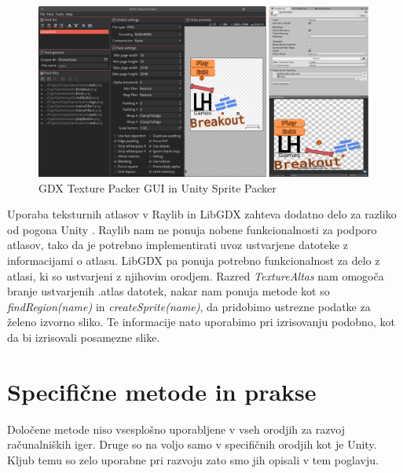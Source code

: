 \documentclass[12pt,a4paper,twoside]{book}
\begin{document}
\begin{figure}[h]
	\centering
	\includegraphics[width=15cm]{texturePacker}
	\caption{GDX Texture Packer GUI in Unity Sprite Packer}
	\label{slika:texturePacker}
\end{figure}
Uporaba teksturnih atlasov v Raylib in LibGDX zahteva dodatno delo za razliko od pogona Unity . Raylib nam ne ponuja nobene funkcionalnosti za podporo atlasov, tako da je potrebno implementirati uvoz ustvarjene datoteke z informacijami o atlasu. LibGDX pa ponuja potrebno funkcionalnost za delo z atlasi, ki so ustvarjeni z njihovim orodjem. Razred \textit{TextureAltas} nam omogoča branje ustvarjenih .atlas datotek, nakar nam ponuja metode kot so \textit{findRegion(name)} in \textit{createSprite(name)}, da pridobimo ustrezne podatke za želeno izvorno sliko. Te informacije nato uporabimo pri izrisovanju podobno, kot da bi izrisovali posamezne slike. 

\section{Specifične metode in prakse}
Določene metode niso vsesplošno uporabljene v vseh orodjih za razvoj računalniških iger. Druge so na voljo samo v specifičnih orodjih kot je Unity. Kljub temu so zelo uporabne pri razvoju zato smo jih opisali v tem poglavju.
\end{document}
